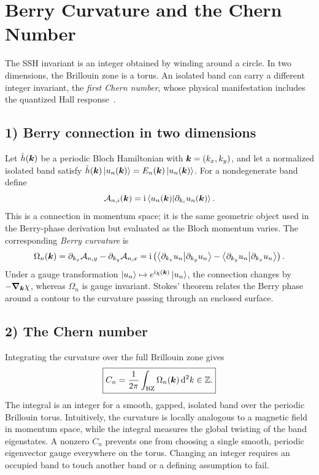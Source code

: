 \section{Berry Curvature and the Chern Number}
The SSH invariant is an integer obtained by winding around a circle. In two dimensions, the Brillouin zone is a torus. An isolated band can carry a different integer invariant, the \emph{first Chern number}, whose physical manifestation includes the quantized Hall response~\cite{TKNN1982,QiZhang2011}.

\subsection*{1) Berry connection in two dimensions}
Let $\hat{h}(\bm{k})$ be a periodic Bloch Hamiltonian with $\bm{k}=(k_x,k_y)$, and let a normalized isolated band satisfy
$\hat{h}(\bm{k})\left|u_n(\bm{k})\right\rangle=E_n(\bm{k})\left|u_n(\bm{k})\right\rangle$.
For a nondegenerate band define
\begin{equation}
\mathcal A_{n,i}(\bm{k})=\mathrm{i}\left\langle u_n(\bm{k})\middle|\partial_{k_i}u_n(\bm{k})\right\rangle.
\end{equation}
This is a connection in momentum space; it is the same geometric object used in the Berry-phase derivation but evaluated as the Bloch momentum varies. The corresponding \emph{Berry curvature} is
\begin{equation}
\Omega_n(\bm{k})=\partial_{k_x}\mathcal A_{n,y}-\partial_{k_y}\mathcal A_{n,x}
=\mathrm{i}\left(\left\langle\partial_{k_x}u_n\middle|\partial_{k_y}u_n\right\rangle
-\left\langle\partial_{k_y}u_n\middle|\partial_{k_x}u_n\right\rangle\right).
\end{equation}
Under a gauge transformation $\left|u_n\right\rangle\mapsto e^{\mathrm{i}\chi(\bm{k})}\left|u_n\right\rangle$, the connection changes by $-\bm{\nabla}_{\bm{k}}\chi$, whereas $\Omega_n$ is gauge invariant. Stokes' theorem relates the Berry phase around a contour to the curvature passing through an enclosed surface.

\subsection*{2) The Chern number}
Integrating the curvature over the full Brillouin zone gives
\begin{equation}\label{eq:chern-def}
\boxed{C_n=\frac1{2\pi}\int_{\mathrm{BZ}}\Omega_n(\bm{k})\,\mathrm{d}^2k\in\mathbb Z.}
\end{equation}
The integral is an integer for a smooth, gapped, isolated band over the periodic Brillouin torus. Intuitively, the curvature is locally analogous to a magnetic field in momentum space, while the integral measures the global twisting of the band eigenstates. A nonzero $C_n$ prevents one from choosing a single smooth, periodic eigenvector gauge everywhere on the torus. Changing an integer requires an occupied band to touch another band or a defining assumption to fail.


